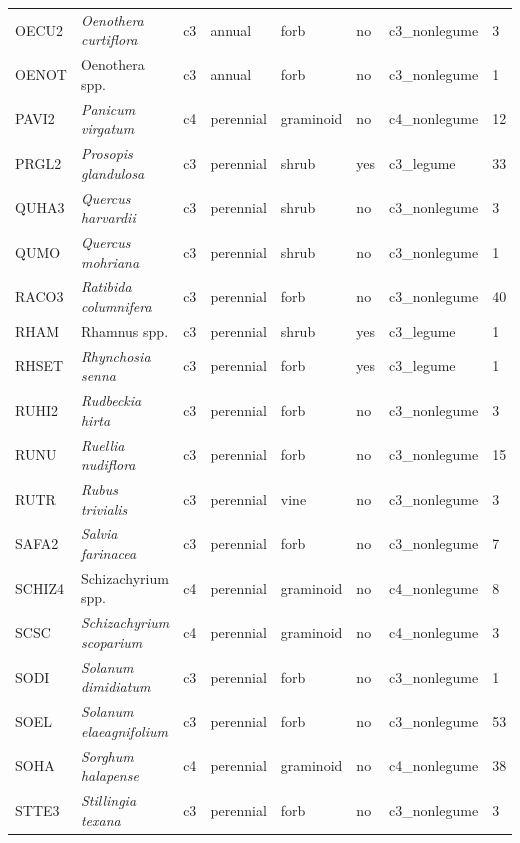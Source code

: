 \begin{landscape}
\begin{table}[]
{\begin{tabular}{p{2cm}p{5cm}p{2cm}p{2cm}p{2cm}p{2cm}p{3.5cm}p{2cm}}
        OECU2  & \textit{Oenothera curtiflora}      & c3 & annual    & forb           & no  & c3\_nonlegume & 3  \\
        OENOT  & Oenothera spp.                     & c3 & annual    & forb           & no  & c3\_nonlegume & 1  \\
        PAVI2  & \textit{Panicum virgatum}          & c4 & perennial & graminoid      & no  & c4\_nonlegume & 12 \\
        PRGL2  & \textit{Prosopis glandulosa}       & c3 & perennial & shrub          & yes & c3\_legume    & 33 \\
        QUHA3  & \textit{Quercus harvardii}         & c3 & perennial & shrub          & no  & c3\_nonlegume & 3  \\
        QUMO   & \textit{Quercus mohriana}          & c3 & perennial & shrub          & no  & c3\_nonlegume & 1  \\
        RACO3  & \textit{Ratibida columnifera}      & c3 & perennial & forb           & no  & c3\_nonlegume & 40 \\
        RHAM   & Rhamnus spp.                       & c3 & perennial & shrub          & yes & c3\_legume    & 1  \\
        RHSET  & \textit{Rhynchosia senna}          & c3 & perennial & forb           & yes & c3\_legume    & 1  \\
        RUHI2  & \textit{Rudbeckia hirta}           & c3 & perennial & forb           & no  & c3\_nonlegume & 3  \\
        RUNU   & \textit{Ruellia nudiflora}         & c3 & perennial & forb           & no  & c3\_nonlegume & 15 \\
        RUTR   & \textit{Rubus trivialis}           & c3 & perennial & vine           & no  & c3\_nonlegume & 3  \\
        SAFA2  & \textit{Salvia farinacea}          & c3 & perennial & forb           & no  & c3\_nonlegume & 7  \\
        SCHIZ4 & Schizachyrium spp.                 & c4 & perennial & graminoid      & no  & c4\_nonlegume & 8  \\
        SCSC   & \textit{Schizachyrium scoparium}   & c4 & perennial & graminoid      & no  & c4\_nonlegume & 3  \\
        SODI   & \textit{Solanum dimidiatum}        & c3 & perennial & forb           & no  & c3\_nonlegume & 1  \\
        SOEL   & \textit{Solanum elaeagnifolium}    & c3 & perennial & forb           & no  & c3\_nonlegume & 53 \\
        SOHA   & \textit{Sorghum halapense}         & c4 & perennial & graminoid      & no  & c4\_nonlegume & 38 \\
        STTE3  & \textit{Stillingia texana}         & c3 & perennial & forb           & no  & c3\_nonlegume & 3
    \end{tabular}}
\end{table}
\end{landscape}
\clearpage

